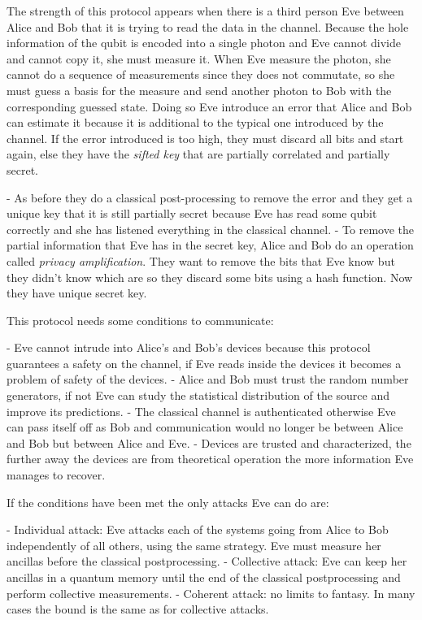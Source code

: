The strength of this protocol appears when there is a third person Eve between Alice and Bob that it is trying to read the data in the channel. Because the hole information of the qubit is encoded into a single photon and Eve cannot divide and cannot copy it, she must measure it. When Eve measure the photon, she cannot do a sequence of measurements since they does not commutate, so she must guess a basis for the measure and send another photon to Bob with the corresponding guessed state. Doing so Eve introduce an error that Alice and Bob can estimate it because it is additional to the typical one introduced by the channel. If the error introduced is too high, they must discard all bits and start again, else they have the \textit{sifted key} that are partially correlated and partially secret.

- As before they do a classical post-processing to remove the error and they get a unique key that it is still partially secret because Eve has read some qubit correctly and she has listened everything in the classical channel.
- To remove the partial information that Eve has in the secret key, Alice and Bob do an operation called \textit{privacy amplification}. They want to remove the bits that Eve know but they didn't know which are so they discard some bits using a hash function. Now they have unique secret key.

This protocol needs some conditions to communicate:

- Eve cannot intrude into Alice’s and Bob’s devices because this protocol guarantees a safety on the channel, if Eve reads inside the devices it becomes a problem of safety of the devices.
- Alice and Bob must trust the random number generators, if not Eve can study the statistical distribution of the source and improve its predictions.
- The classical channel is authenticated otherwise Eve can pass itself off as Bob and  communication would no longer be between Alice and Bob but between Alice and Eve.
- Devices are trusted and characterized, the further away the devices are from theoretical operation the more information Eve manages to recover.

If the conditions have been met the only attacks Eve can do are:

- Individual attack: Eve attacks each of the systems going from Alice to Bob independently of all others, using the same strategy. Eve must measure her ancillas before the classical postprocessing.
- Collective attack: Eve can keep her ancillas in a quantum memory until the end of the classical postprocessing and perform collective measurements.
- Coherent attack: no limits to fantasy. In many cases the bound is the same as for collective attacks.

